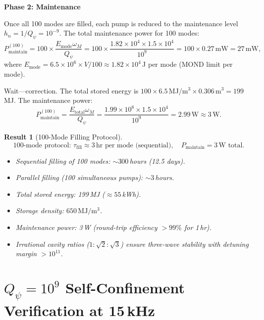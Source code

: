 \documentclass[11pt]{article}
\newtheorem{result}[theorem]{Result}
\theoremstyle{definition}
\theoremstyle{remark}
\newcommand{\Qpsi}{Q_\psi}
\begin{document}
\textbf{Phase 2: Maintenance}

Once all 100 modes are filled, each pump is reduced to the maintenance
level $h_n = 1/\Qpsi = 10^{-9}$. The total maintenance power for 100
modes:
\begin{equation}
P_{\mathrm{maintain}}^{(100)} = 100 \times \frac{E_{\mathrm{mode}} \omega_M}{\Qpsi}
= 100 \times \frac{1.82 \times 10^4 \times 1.5 \times 10^4}{10^9}
= 100 \times 0.27\,\mathrm{mW} = 27\,\mathrm{mW},
\end{equation}
where $E_{\mathrm{mode}} = 6.5 \times 10^6 \times V / 100 \approx
1.82 \times 10^4$\,J per mode (MOND limit per mode).

Wait---correction. The total stored energy is $100 \times 6.5$\,MJ/m$^3
\times 0.306$\,m$^3 = 199$\,MJ. The maintenance power:
\begin{equation}
P_{\mathrm{maintain}}^{(100)} = \frac{E_{\mathrm{total}} \omega_M}{\Qpsi}
= \frac{1.99 \times 10^8 \times 1.5 \times 10^4}{10^9}
= 2.99\,\mathrm{W} \approx 3\,\mathrm{W}.
\end{equation}

\begin{result}[100-Mode Filling Protocol]\label{res:filling}
\begin{equation}
\boxed{\text{100-mode protocol: } \tau_{\mathrm{fill}} \approx 3\,\text{hr per mode (sequential)},
\quad P_{\mathrm{maintain}} = 3\,\text{W total}.}
\end{equation}
\begin{itemize}
\item Sequential filling of 100 modes: $\sim 300$\,hours (12.5 days).
\item Parallel filling (100 simultaneous pumps): $\sim 3$\,hours.
\item Total stored energy: 199\,MJ ($\approx 55$\,kWh).
\item Storage density: $650\,\mathrm{MJ/m^3}$.
\item Maintenance power: 3\,W (round-trip efficiency $>99\%$ for 1\,hr).
\item Irrational cavity ratios ($1:\sqrt{2}:\sqrt{3}$) ensure
three-wave stability with detuning margin $> 10^{11}$.
\end{itemize}
\end{result}

\section{$\Qpsi = 10^9$ Self-Confinement Verification at 15\,kHz}
\label{sec:Qpsi-verify}
\end{document}
